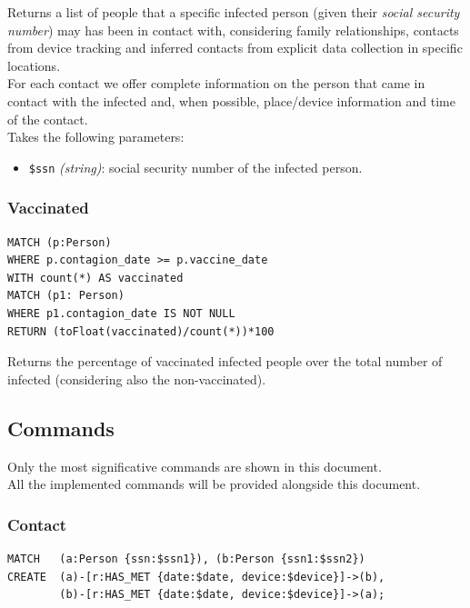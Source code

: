 \documentclass[12pt, a4paper]{article}
\begin{document}
\noindent %
Returns a list of people that a specific infected person (given their 
\emph{social security number}) may has been in contact with, considering 
family relationships, contacts from device tracking and inferred contacts from
explicit data collection in specific locations. \\
For each contact we offer complete information on the person that came in 
contact with the infected and, when possible, place/device information and 
time of the contact. \\
Takes the following parameters: 
\begin{itemize}
    \item \texttt{\$ssn} \emph{(string)}: social security number of the 
        infected person.
\end{itemize}

\subsubsection{Vaccinated}

\begin{tcolorbox}[fontupper=\scriptsize]
    \begin{verbatim}
MATCH (p:Person)
WHERE p.contagion_date >= p.vaccine_date
WITH count(*) AS vaccinated
MATCH (p1: Person)
WHERE p1.contagion_date IS NOT NULL
RETURN (toFloat(vaccinated)/count(*))*100
    \end{verbatim}
\end{tcolorbox}

\noindent %
Returns the percentage of vaccinated infected people over the total 
number of infected (considering also the non-vaccinated).


\subsection{Commands}

Only the most significative commands are shown in this document. \\
All the implemented commands will be provided alongside this document.

\subsubsection{Contact}

\begin{tcolorbox}[fontupper=\scriptsize]
    \begin{verbatim}
MATCH   (a:Person {ssn:$ssn1}), (b:Person {ssn1:$ssn2})
CREATE  (a)-[r:HAS_MET {date:$date, device:$device}]->(b), 
        (b)-[r:HAS_MET {date:$date, device:$device}]->(a);
    \end{verbatim}
\end{tcolorbox}
\end{document}
